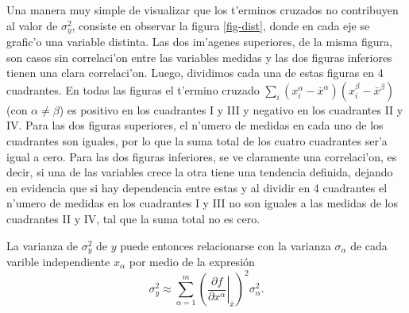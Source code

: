 \documentclass[letterpaper,11pt]{report}
\begin{document}
Una manera muy simple de visualizar que los t'erminos cruzados no contribuyen al valor de $\sigma_y^2$, consiste en observar la figura \ref{fig-dist}, donde en cada eje se grafic'o una variable distinta. Las dos im'agenes superiores, de la misma figura, son casos sin correlaci'on entre las variables medidas y las dos figuras inferiores tienen una clara correlaci'on. 
Luego, dividimos cada una de estas figuras en 4 cuadrantes. En todas las figuras el t'ermino cruzado $\sum_i(x_i^\alpha-\bar{x}^\alpha)(x_i^\beta-\bar{x}^\beta)$ (con $\alpha\neq\beta$) es positivo en los cuadrantes I y III y negativo en los cuadrantes II y IV. 
Para las dos figuras superiores, el n'umero de medidas en cada uno de los cuadrantes son iguales, por lo que la suma total de los cuatro cuadrantes ser'a igual a cero. 
Para las dos figuras inferiores, se ve claramente una correlaci'on, es decir, si una de las variables crece la otra tiene una tendencia definida, dejando en evidencia que si hay dependencia entre estas y al dividir en 4 cuadrantes el n'umero de medidas en los cuadrantes I y III no son iguales a las medidas de los cuadrantes II y IV, tal que la suma total no es cero. 

La varianza de $\sigma_y^2$ de $y$ puede entonces relacionarse con la varianza $\sigma_\alpha$ de cada varible independiente $x_\alpha$ por medio de la expresión
\begin{equation}\label{pe}
\sigma_y^2\approx\sum_{\alpha=1}^m\left(\left.\frac{\partial f}{\partial x^\alpha}\right|_{\bar{x}}\right)^2\sigma_\alpha^2.
\end{equation}
\end{document}
